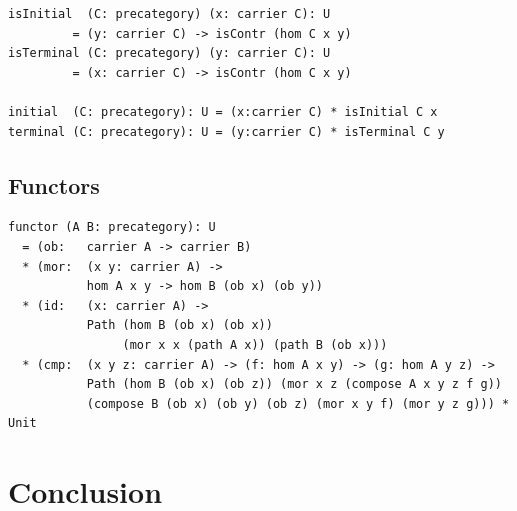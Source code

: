 \documentclass{article}
\begin{document}
\begin{lstlisting}[mathescape=true]
isInitial  (C: precategory) (x: carrier C): U
         = (y: carrier C) -> isContr (hom C x y)
isTerminal (C: precategory) (y: carrier C): U
         = (x: carrier C) -> isContr (hom C x y)

initial  (C: precategory): U = (x:carrier C) * isInitial C x
terminal (C: precategory): U = (y:carrier C) * isTerminal C y
\end{lstlisting}

\subsection{Functors}

\begin{lstlisting}[mathescape=true]
functor (A B: precategory): U
  = (ob:   carrier A -> carrier B)
  * (mor:  (x y: carrier A) ->
           hom A x y -> hom B (ob x) (ob y))
  * (id:   (x: carrier A) ->
           Path (hom B (ob x) (ob x))
                (mor x x (path A x)) (path B (ob x)))
  * (cmp:  (x y z: carrier A) -> (f: hom A x y) -> (g: hom A y z) ->
           Path (hom B (ob x) (ob z)) (mor x z (compose A x y z f g))
           (compose B (ob x) (ob y) (ob z) (mor x y f) (mor y z g))) * Unit
\end{lstlisting}

\newpage
\section{Conclusion}
\end{document}
